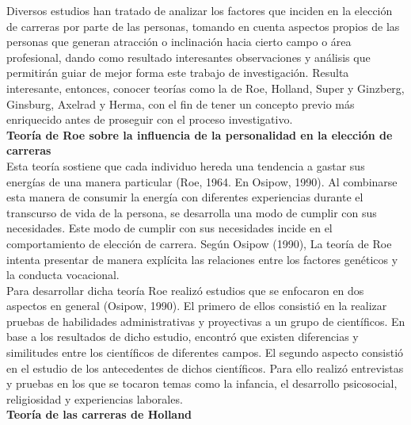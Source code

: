 %



	Diversos estudios han tratado de analizar los factores que inciden en la elección de carreras por parte de las personas, tomando en cuenta aspectos propios de las personas que generan atracción o inclinación hacia cierto campo o área profesional, dando como resultado interesantes observaciones y análisis que permitirán guiar de mejor forma este trabajo de investigación. Resulta interesante, entonces, conocer teorías como la de Roe, Holland, Super y Ginzberg, Ginsburg, Axelrad y Herma, con el fin de tener un concepto previo más enriquecido antes de proseguir con el proceso investigativo. \\
	
	\textbf{Teoría de Roe sobre la influencia de la personalidad en la elección de carreras}\\
	
	Esta teoría sostiene que cada individuo hereda una tendencia a gastar sus energías de una manera particular (Roe, 1964. En Osipow, 1990). Al combinarse esta manera de consumir la energía con diferentes experiencias durante el transcurso de vida de la persona, se desarrolla una modo de cumplir con sus necesidades. Este modo de cumplir con sus necesidades incide en el comportamiento de elección de carrera. Según Osipow (1990), La teoría de Roe intenta presentar de manera explícita las relaciones entre los factores genéticos y la conducta vocacional.\\
	
	Para desarrollar dicha teoría Roe realizó estudios que se enfocaron en dos aspectos en general (Osipow, 1990). El primero de ellos consistió en la realizar pruebas de habilidades administrativas y proyectivas a un grupo de científicos. En base a los resultados de dicho estudio, encontró que existen diferencias y similitudes entre los científicos de diferentes campos. El segundo aspecto consistió en el estudio de los antecedentes de dichos científicos. Para ello realizó entrevistas y pruebas en los que se tocaron temas como la infancia, el desarrollo psicosocial, religiosidad y experiencias laborales.\\
	
	\textbf{Teoría de las carreras de Holland}\\
	
